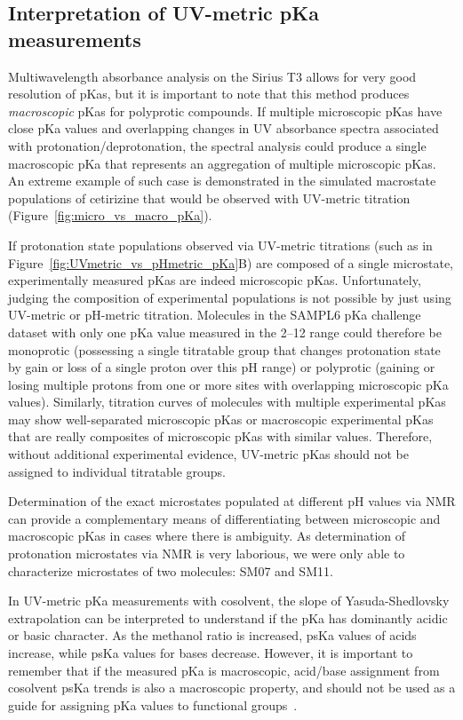 \documentclass[9pt,lineno]{elife}
\begin{document}
\subsection{Interpretation of UV-metric pKa measurements}

Multiwavelength absorbance analysis on the Sirius T3 allows for very good resolution of pKas, but it is important to note that this method produces \emph{macroscopic} pKas for polyprotic compounds. 
If multiple microscopic pKas have close pKa values and overlapping changes in UV absorbance spectra associated with protonation/deprotonation, the spectral analysis could produce a single macroscopic pKa that represents an aggregation of multiple microscopic pKas. 
An extreme example of such case is demonstrated in the simulated macrostate populations of cetirizine that would be observed with UV-metric titration (Figure~\ref{fig:micro_vs_macro_pKa}).

If protonation state populations observed via UV-metric titrations (such as in Figure~\ref{fig:UVmetric_vs_pHmetric_pKa}B) are composed of a single microstate, experimentally measured pKas are indeed microscopic pKas.  
Unfortunately, judging the composition of experimental populations is not possible by just using UV-metric or pH-metric titration. 
Molecules in the SAMPL6 pKa challenge dataset with only one pKa value measured in the 2--12 range could therefore be monoprotic (possessing a single titratable group that changes protonation state by gain or loss of a single proton over this pH range) or polyprotic (gaining or losing multiple protons from one or more sites with overlapping microscopic pKa values). 
Similarly, titration curves of molecules with multiple experimental pKas may show well-separated microscopic pKas or macroscopic experimental pKas that are really composites of microscopic pKas with similar values. 
Therefore, without additional experimental evidence, UV-metric pKas should not be assigned to individual titratable groups. 

Determination of the exact microstates populated at different pH values via NMR can provide a complementary means of differentiating between microscopic and macroscopic pKas in cases where there is ambiguity.
As determination of protonation microstates via NMR is very laborious, we were only able to characterize microstates of two molecules: SM07 and SM11. 

In UV-metric pKa measurements with cosolvent, the slope of Yasuda-Shedlovsky extrapolation can be interpreted to understand if the pKa has dominantly acidic or basic character. 
As the methanol ratio is increased, psKa values of acids increase, while psKa values for bases decrease. 
However, it is important to remember that if the measured pKa is macroscopic, acid/base assignment from cosolvent psKa trends is also a macroscopic property, and should not be used as a guide for assigning pKa values to functional groups~\citep{fraczkiewicz_silico_2013}.
\end{document}
